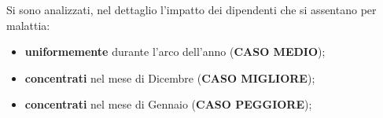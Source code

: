 Si sono analizzati, nel dettaglio l'impatto dei dipendenti che si assentano per malattia:
\begin{itemize}
\item \textbf{uniformemente} durante l'arco dell'anno (\textbf{CASO MEDIO});
\item \textbf{concentrati} nel mese di Dicembre (\textbf{CASO MIGLIORE});
\item \textbf{concentrati} nel mese di Gennaio (\textbf{CASO PEGGIORE});
\end{itemize} 




%
%

\begin{comment}
\begin{savenotes}
\begin{table}[htb]
\centering
 \caption{Variazione VAN (Caso Teorico)}
 \begin{tabular}{p{4cm}D{,}{,}{5.2}D{,}{,}{5.2}D{,}{,}{5.2}D{,}{,}{7.4}}
 \toprule
 	& \multicolumn{1}{c}{Flusso di cassa mensile (\euro)} & \multicolumn{1}{c}{Contratti Mensili } &\multicolumn{1}{c}{\textbf{VAN}}&\multicolumn{1}{c}{\textbf{ \% Contratti}} \\
 \midrule	
 	\makebox[4cm][r]{Pareggio} & 65\thinspace 355,07 & 939,18 & 0,00 & 0,1154\\ 
	\makebox[4cm][r]{Ottimo} & 553\thinspace 419,36 & 8\thinspace 138,52 & 5\thinspace 248\thinspace 057,65 & 1,0000\\
	\makebox[4cm][r]{Caso di Studio 20,0 \%} & 110\thinspace 683,87 & 1\thinspace 627,70 & 487\thinspace 411,50 & 0,2000\\
	\makebox[4cm][r]{Caso di Studio 15,0 \%} & 83\thinspace 012,90 & 1\thinspace 220,78 & 189\thinspace 871,11 & 0,1500 \\
	\makebox[4cm][r]{Caso di Studio 12,5 \%} & 69\thinspace 177,42 & 1\thinspace 017,32 & 41\thinspace 100,92 & 0,1250 \\
 \bottomrule
 \end{tabular} 
\end{table}
\end{savenotes}
\end{comment}

